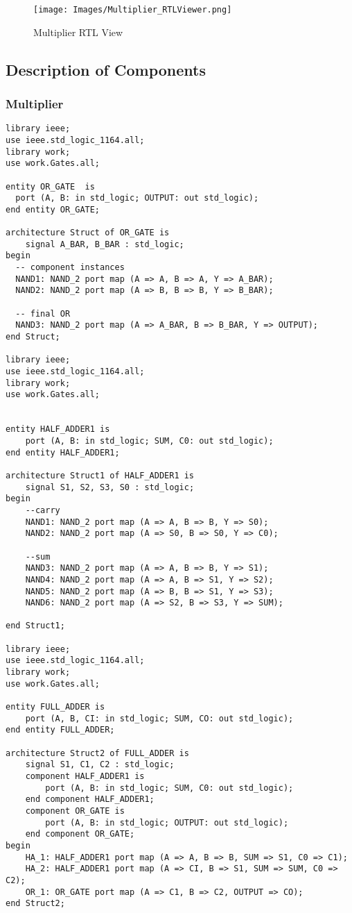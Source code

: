 \documentclass[12pt]{article}
\begin{document}
\begin{figure}[H]
\centering
  \texttt{[image: Images/Multiplier\_RTLViewer.png]}
  \caption{Multiplier RTL View}
\end{figure}

\subsection{Description of Components}
\subsubsection{Multiplier}
\begin{verbatim}
library ieee;
use ieee.std_logic_1164.all;
library work;
use work.Gates.all;

entity OR_GATE  is
  port (A, B: in std_logic; OUTPUT: out std_logic);
end entity OR_GATE;

architecture Struct of OR_GATE is
	signal A_BAR, B_BAR : std_logic;
begin
  -- component instances
  NAND1: NAND_2 port map (A => A, B => A, Y => A_BAR);
  NAND2: NAND_2 port map (A => B, B => B, Y => B_BAR);
  
  -- final OR
  NAND3: NAND_2 port map (A => A_BAR, B => B_BAR, Y => OUTPUT);
end Struct;

library ieee;
use ieee.std_logic_1164.all;
library work;
use work.Gates.all;


entity HALF_ADDER1 is
	port (A, B: in std_logic; SUM, C0: out std_logic);
end entity HALF_ADDER1;

architecture Struct1 of HALF_ADDER1 is
	signal S1, S2, S3, S0 : std_logic;
begin
	--carry
	NAND1: NAND_2 port map (A => A, B => B, Y => S0);
	NAND2: NAND_2 port map (A => S0, B => S0, Y => C0);
	
	--sum
	NAND3: NAND_2 port map (A => A, B => B, Y => S1);
	NAND4: NAND_2 port map (A => A, B => S1, Y => S2);
	NAND5: NAND_2 port map (A => B, B => S1, Y => S3);
	NAND6: NAND_2 port map (A => S2, B => S3, Y => SUM);

end Struct1;

library ieee;
use ieee.std_logic_1164.all;
library work;
use work.Gates.all;

entity FULL_ADDER is
	port (A, B, CI: in std_logic; SUM, CO: out std_logic);
end entity FULL_ADDER;

architecture Struct2 of FULL_ADDER is
	signal S1, C1, C2 : std_logic;
	component HALF_ADDER1 is
		port (A, B: in std_logic; SUM, C0: out std_logic);
	end component HALF_ADDER1;
	component OR_GATE is
		port (A, B: in std_logic; OUTPUT: out std_logic);
	end component OR_GATE;
begin
	HA_1: HALF_ADDER1 port map (A => A, B => B, SUM => S1, C0 => C1);
	HA_2: HALF_ADDER1 port map (A => CI, B => S1, SUM => SUM, C0 => C2);
	OR_1: OR_GATE port map (A => C1, B => C2, OUTPUT => CO);
end Struct2;


\end{verbatim}
\end{document}
